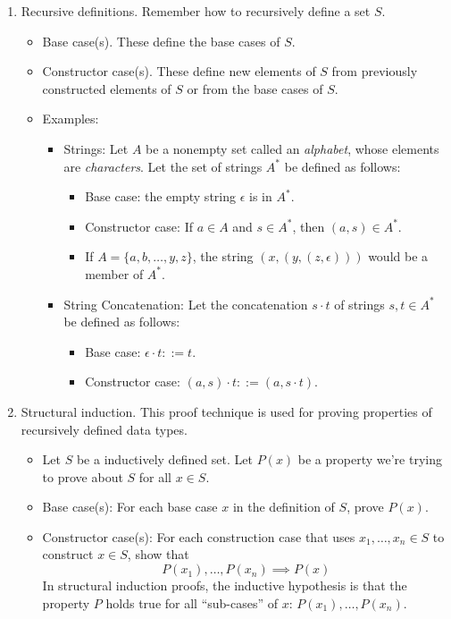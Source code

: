 \documentclass[12pt]{article}
\begin{document}
\begin{enumerate}

\item Recursive definitions. Remember how to recursively define a set $S$.
\begin{itemize}
\item Base case(s). These define the base cases of $S$.
\item Constructor case(s). These define new elements of $S$ from previously constructed elements of $S$ or from the base cases of $S$.
\item Examples:
	\begin{itemize}
	\item Strings: Let $A$ be a nonempty set called an \textit{alphabet}, whose elements are \textit{characters}. Let the set of strings $A^*$ be defined as follows:
		\begin{itemize}
		\item Base case: the empty string $\epsilon$ is in $A^*$.
		\item Constructor case: If $a \in A$ and $s \in A^*$, then $(a,s) \in A^*$.
		\item If $A = \{a,b,\ldots,y,z\}$, the string $(x,(y,(z,\epsilon)))$ would be a member of $A^*$.
		\end{itemize}
	\item String Concatenation: Let the concatenation $s \cdot t$ of strings $s,t \in A^*$ be defined as follows:
		\begin{itemize}
		\item Base case: $\epsilon \cdot t ::= t$.
		\item Constructor case: $(a,s) \cdot t ::= (a,s \cdot t)$.
		\end{itemize}
	\end{itemize}
\end{itemize}

\item Structural induction. This proof technique is used for proving properties of recursively defined data types.
\begin{itemize}
\item Let $S$ be a inductively defined set. Let $P(x)$ be a property we're trying to prove about $S$ for all $x \in S$.
\item Base case(s): For each base case $x$ in the definition of $S$, prove $P(x)$.
\item Constructor case(s): For each construction case that uses $x_1, \ldots, x_n \in S$ to construct $x \in S$, show that
$$P(x_1), \ldots, P(x_n) \implies P(x)$$
In structural induction proofs, the inductive hypothesis is that the property $P$ holds true for all ``sub-cases'' of $x$: $P(x_1),\ldots,P(x_n)$.
\end{itemize}

\end{enumerate}
\end{document}
